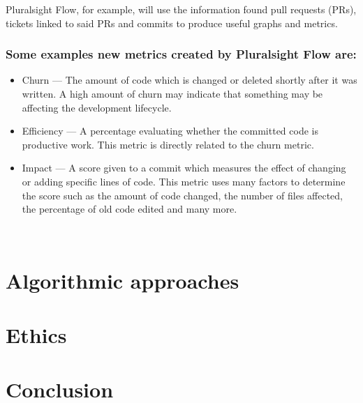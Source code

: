 \documentclass{article}
\begin{document}
Pluralsight Flow, for example, will use the information found pull requests
(PRs), tickets linked to said PRs and commits to produce useful graphs and
metrics.

\subsubsection*{Some examples new metrics created by Pluralsight Flow are:}
\begin{itemize}
  \item Churn --- The amount of code which is changed or deleted shortly after
    it was written. A high amount of churn may indicate that something may be
    affecting the development lifecycle.
  \item Efficiency --- A percentage evaluating whether the committed code is
    productive work. This metric is directly related to the churn metric.
  \item Impact --- A score given to a commit which measures the effect of
    changing or adding specific lines of code. This metric uses many factors to
    determine the score such as the amount of code changed, the number of files
    affected, the percentage of old code edited and many more.
\end{itemize}
~\cite{plural2019sight2}

\section{Algorithmic approaches}

\section{Ethics}

\section{Conclusion}

\newpage



\end{document}
